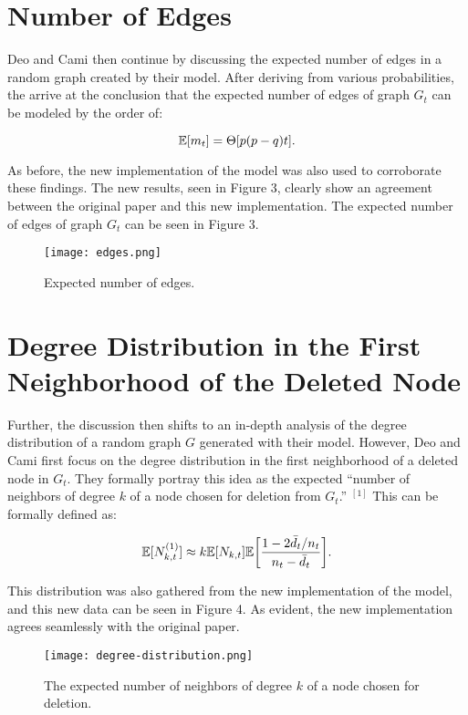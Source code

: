\documentclass[final,3p,times,twocolumn]{elsarticle}
\begin{document}
\section{Number of Edges}
\label{S:5}

Deo and Cami then continue by discussing the expected number of edges in a random graph created by their model. After deriving from various probabilities, the arrive at the conclusion that the expected number of edges of graph $G_t$ can be modeled by the order of:

\begin{equation}
\centering
    \mathbb{E}[m_t] = \Theta[p(p - q)t].
\end{equation}

As before, the new implementation of the model was also used to corroborate these findings. The new results, seen in Figure 3, clearly show an agreement between the original paper and this new implementation. The expected number of edges of graph $G_t$ can be seen in Figure 3.

\begin{figure}[h]
\centering\texttt{[image: edges.png]}
\caption{Expected number of edges.}
\end{figure}

\section{Degree Distribution in the First Neighborhood of the Deleted Node}
\label{S:6}

Further, the discussion then shifts to an in-depth analysis of the degree distribution of a random graph $G$ generated with their model. However, Deo and Cami first focus on the degree distribution in the first neighborhood of a deleted node in $G_t$. They formally portray this idea as the expected “number of neighbors of degree $k$ of a node chosen for deletion from $G_t$.” $^{[1]}$ This can be formally defined as:

\begin{equation}
\centering
    \mathbb{E}[N_{k, t}^{(1)}] \approx k\mathbb{E}[N_{k, t}]\mathbb{E}\bigg[\frac{1 - 2\bar{d}_t/n_t}{n_t - \bar{d}_t}\bigg].
\end{equation}

This distribution was also gathered from the new implementation of the model, and this new data can be seen in Figure 4. As evident, the new implementation agrees seamlessly with the original paper.

\begin{figure}[h]
\centering\texttt{[image: degree-distribution.png]}
\caption{The expected number of neighbors of degree $k$ of a node chosen for deletion.}
\end{figure}
\end{document}
